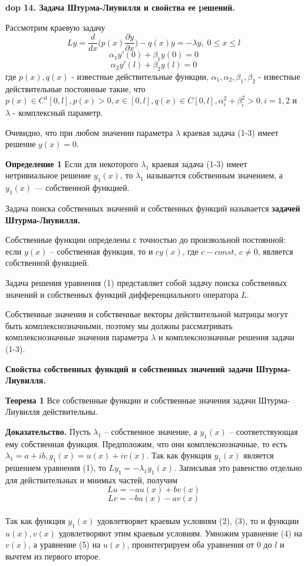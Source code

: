 \textbf{\LARGE dop 14. Задача Штуpма-Лиувилля и свойства ее pешений.}

Рассмотрим краевую задачу
\begin{equation}
    Ly = \frac{d}{dx} \Big( p(x) \frac{\partial y}{\partial x} \Big) - q(x) y = - \lambda y, \; 0\leq x \leq l
\end{equation}
\begin{equation}
    \alpha_1 y'(0)+\beta_1 y(0)=0
\end{equation}
\begin{equation}
    \alpha_2 y'(l)+\beta_2 y(l)=0
\end{equation}
где $p(x), q(x)$ - известные действительные функции, $\alpha_1, \alpha_2, \beta_1, \beta_2$ - известные действительные постоянные такие, что $p(x)\in C^1[0,l], p(x)>0, x\in[0,l], q(x)\in C[0,l], \alpha_i^2+\beta_i^2>0, i=1,2$ и $\lambda$ - комплексный параметр.

Очевидно, что при любом значении параметра $\lambda$ краевая задача (1-3) имеет решение $y(x) = 0$.

\textbf{Определение 1} Если для некоторого $\lambda_1$ краевая задача (1-3) имеет нетривиальное решение $y_1(x)$, то $\lambda_1$ называется собственным значением, а $y_1(x)$ --- собственной функцией.

Задача поиска собственных значений и собственных функций называется \textbf{задачей Штурма-Лиувилля.}

Собственные функции определены с точностью до произвольной постоянной: если $y(x)$ – собственная функция, то и $cy(x)$, где $c-const, \, c \neq 0$, является собственной функцией.

Задача решения уравнения (1) представляет собой задачу поиска собственных значений и собственных функций дифференциального
оператора $L$.

Собственные значения и собственные векторы действительной матрицы могут быть комплекснозначными, поэтому мы должны рассматривать комплекснозначные значения параметра $\lambda$ и комплекснозначные решения задачи (1-3).

\textbf{Свойства собственных функций и собственных значений задачи Штурма-Лиувилля.}

\textbf{Теорема 1} Все собственные функции и собственные значения
задачи Штурма-Лиувилля действительны.

\textbf{Доказательство.} Пусть $\lambda_1$ – собственное значение, а $y_1(x)$ – соответствующая ему собственная функция. Предположим, что они комплекснозначные, то есть $\lambda_1 = a + ib, y_1(x) = u(x) + iv(x)$. Так как функция
$y_1(x)$ является решением уравнения (1), то $Ly_1 = -\lambda_1 y_1(x)$. Записывая это равенство отдельно для действительных и мнимых частей,
получим
\begin{equation}
    Lu=-au(x)+bv(x)
\end{equation}
\begin{equation}
    Lv=-bu(x)-av(x)
\end{equation}
\\Так как функция $y_1(x)$ удовлетворяет краевым условиям (2), (3),
то и функции $u(x), v(x)$ удовлетворяют этим краевым условиям.
Умножим уравнение (4) на $v(x)$, а уравнение (5) на $u(x)$, проинтегрируем оба уравнения от 0 до $l$ и вычтем из первого второе.

